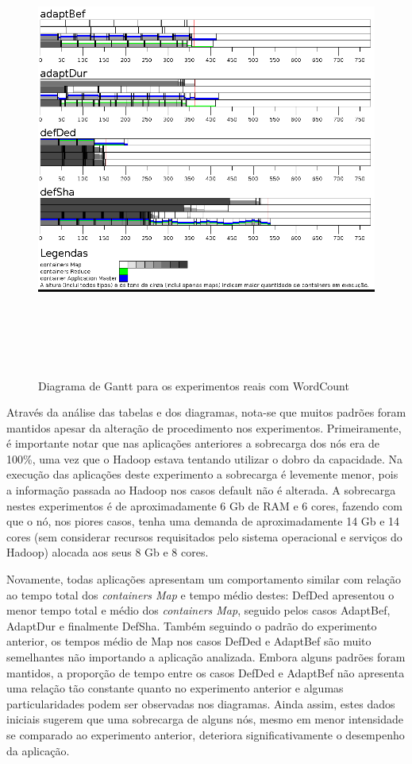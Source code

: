 \begin{figure}[!ht]
	\centering
	\includegraphics[height=15cm]{figuras/WC-real.png}
	\caption{Diagrama de Gantt para os experimentos reais com WordCount}
	\label{fig:exp2WC}
\end{figure}

Através da análise das tabelas e dos diagramas, nota-se que muitos padrões foram mantidos apesar da alteração de procedimento nos experimentos. Primeiramente, é importante notar que nas aplicações anteriores a sobrecarga dos nós era de 100\%, uma vez que o Hadoop estava tentando utilizar o dobro da capacidade. Na execução das aplicações deste experimento a sobrecarga é levemente menor, pois a informação passada ao Hadoop nos casos default não é alterada. A sobrecarga nestes experimentos é de aproximadamente 6 Gb de RAM e 6 cores, fazendo com que o nó, nos piores casos, tenha uma demanda de aproximadamente 14 Gb e 14 cores (sem considerar recursos requisitados pelo sistema operacional e serviços do Hadoop) alocada aos seus 8 Gb e 8 cores.

Novamente, todas aplicações apresentam um comportamento similar com relação ao tempo total dos \textit{containers Map} e tempo médio destes: DefDed apresentou o menor tempo total e médio dos \textit{containers Map}, seguido pelos casos AdaptBef, AdaptDur e finalmente DefSha. Também seguindo o padrão do experimento anterior, os tempos médio de Map nos casos DefDed e AdaptBef são muito semelhantes não importando a aplicação analizada. Embora alguns padrões foram mantidos, a proporção de tempo entre os casos DefDed e AdaptBef não apresenta uma relação tão constante quanto no experimento anterior e algumas particularidades podem ser observadas nos diagramas. Ainda assim, estes dados iniciais sugerem que uma sobrecarga de alguns nós, mesmo em menor intensidade se comparado ao experimento anterior, deteriora significativamente o desempenho da aplicação.

